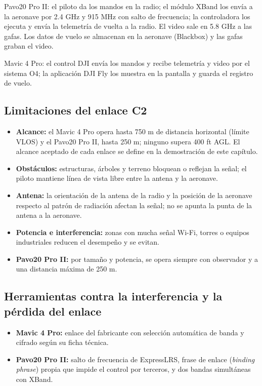 Pavo20 Pro II: el piloto da los mandos en la radio; el módulo XBand los envía a la aeronave por 2.4 GHz y 915 MHz con salto de frecuencia; la controladora los ejecuta y envía la telemetría de vuelta a la radio. El video sale en 5.8 GHz a las gafas. Los datos de vuelo se almacenan en la aeronave (Blackbox) y las gafas graban el video.

Mavic 4 Pro: el control DJI envía los mandos y recibe telemetría y video por el sistema O4; la aplicación DJI Fly los muestra en la pantalla y guarda el registro de vuelo.

\subsection{Limitaciones del enlace C2}

\begin{itemize}
\item \textbf{Alcance:} el Mavic 4 Pro opera hasta 750 m de distancia horizontal (límite VLOS) y el Pavo20 Pro II, hasta 250 m; ninguno supera 400 ft AGL. El alcance aceptado de cada enlace se define en la demostración de este capítulo.
\item \textbf{Obstáculos:} estructuras, árboles y terreno bloquean o reflejan la señal; el piloto mantiene línea de vista libre entre la antena y la aeronave.
\item \textbf{Antena:} la orientación de la antena de la radio y la posición de la aeronave respecto al patrón de radiación afectan la señal; no se apunta la punta de la antena a la aeronave.
\item \textbf{Potencia e interferencia:} zonas con mucha señal Wi-Fi, torres o equipos industriales reducen el desempeño y se evitan.
\item \textbf{Pavo20 Pro II:} por tamaño y potencia, se opera siempre con observador y a una distancia máxima de 250 m.
\end{itemize}

\subsection{Herramientas contra la interferencia y la pérdida del enlace}

\begin{itemize}
\item \textbf{Mavic 4 Pro:} enlace del fabricante con selección automática de banda y cifrado según su ficha técnica.
\item \textbf{Pavo20 Pro II:} salto de frecuencia de ExpressLRS, frase de enlace (\textit{binding phrase}) propia que impide el control por terceros, y dos bandas simultáneas con XBand.
\end{itemize}

